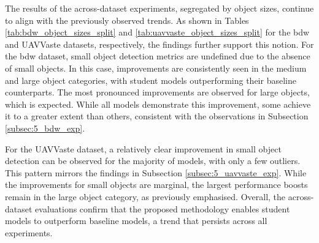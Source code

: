 The results of the across-dataset experiments, segregated by object sizes, continue to align with the previously observed trends. As shown in Tables \ref{tab:bdw_object_sizes_split} and \ref{tab:uavvaste_object_sizes_split} for the \gls{bdw} and UAVVaste datasets, respectively, the findings further support this notion. For the \gls{bdw} dataset, small object detection metrics are undefined due to the absence of small objects. In this case, improvements are consistently seen in the medium and large object categories, with student models outperforming their baseline counterparts. The most pronounced improvements are observed for large objects, which is expected. While all models demonstrate this improvement, some achieve it to a greater extent than others, consistent with the observations in Subsection \ref{subsec:5_bdw_exp}.

For the UAVVaste dataset, a relatively clear improvement in small object detection can be observed for the majority of models, with only a few outliers. This pattern mirrors the findings in Subsection \ref{subsec:5_uavvaste_exp}. While the improvements for small objects are marginal, the largest performance boosts remain in the large object category, as previously emphasised. Overall, the across-dataset evaluations confirm that the proposed methodology enables student models to outperform baseline models, a trend that persists across all experiments.

